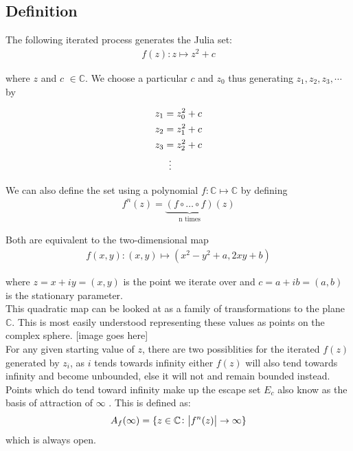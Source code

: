 \documentclass[12pt]{article}
\begin{document}
\subsection{Definition}
{\parindent0pt

The following iterated process generates the Julia set\cite{Frame}:
\begin{align*}
f(z) \colon z  \mapsto z^{2} +c
\end{align*}

where $z$ and $c$ $\in \mathbb{C}$. We choose a particular $c$ and  $z_0$ thus  generating $z_1, z_2, z_3,  \cdots$ by

\begin{align*}
z_1 &= z_0^{2} + c \\
z_2 &= z_1^{2} + c \\
z_3 &= z_2^{2} + c \\
&\mathrel{\makebox[\widthof{=}]{\vdots}} \\
\end{align*}

We can also define the set using a polynomial $f \colon \mathbb{C} \mapsto \mathbb{C}$ by defining \cite{Fassett}
\begin{align*}
f^{n}(z) = \underbrace{ (f  \circ \hdots \circ f)}_{\text{n times}}(z)
\end{align*}

Both are equivalent to the two-dimensional map \cite{hypertext}
\begin{align*}
f (x,y) \colon (x,y) \mapsto (x^{2} - y^{2} + a, 2xy + b)
\end{align*}

where $z = x + iy = (x,y)$ is the point we iterate over and $c = a+ib = (a,b)$ is the stationary parameter. \\

This quadratic map can be looked at as a family of transformations to the plane $\mathbb{C}$. This is most easily understood representing these values as points on the complex sphere. \cite{hypertext} [image goes here] \\

For any given starting value of $z$, there are two possiblities for the iterated $f(z)$ generated by $z_i$, \cite{goodwin} as $i$ tends towards infinity either $f(z)$ will also tend towards infinity and become unbounded, else it will not and remain bounded instead. Points which do tend toward infinity make up the escape set $E_c$  also know as the basis of attraction of $\infty$ \cite{Fassett}. This is defined as: 
\begin{align*}
A_f(\infty) =  \{ z \in \mathbb{C} \colon \abs{ f^{n}(z)} \rightarrow \infty \}
\end{align*}
which is always open. \\

}
\end{document}
